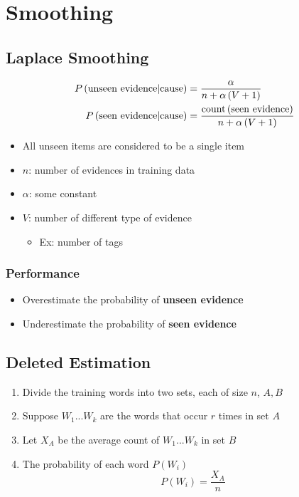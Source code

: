 \section{Smoothing}

  \subsection{Laplace Smoothing}

    \begin{align}
      P\left( \text{unseen evidence} | \text{cause} \right)
        &= \frac{\alpha}{n + \alpha \left( V + 1 \right)} \\
      P\left( \text{seen evidence} | \text{cause} \right)
        &= \frac{\operatorname{count}\left( \text{seen evidence} \right)}{n + \alpha \left( V + 1 \right)}
    \end{align}

    \begin{itemize}
      \item All unseen items are considered to be a single item
      \item $ n $: number of evidences in training data
      \item $ \alpha $: some constant
      \item $ V $: number of different type of evidence
      \begin{itemize}
        \item Ex: number of tags
      \end{itemize}
    \end{itemize}

    \subsubsection{Performance}

      \begin{itemize}
        \item Overestimate the probability of \textbf{unseen evidence}
        \item Underestimate the probability of \textbf{seen evidence}
      \end{itemize}

  \subsection{Deleted Estimation}

    \begin{enumerate}
      \item Divide the training words into two sets, each of size $ n $,
      $ A, B $
      \item Suppose $ W_{1} ... W_{k} $ are the words that occur $ r $ times
      in set $ A $
      \item Let $ X_{A} $ be the average count of $ W_{1} ... W_{k} $ in set
      $ B $
      \item The probability of each word $ P\left( W_{i} \right) $
      \begin{equation}
        P\left( W_{i} \right) = \frac{X_{A}}{n}
      \end{equation}
    \end{enumerate}

